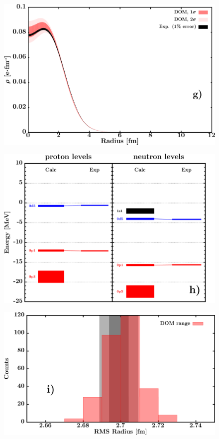 \documentclass[twocolumn,secnumarabic,amssymb, nobibnotes, aps, prl,
superscriptaddress, nobalancelastpage, draft]{revtex4}
\begin{document}
\begin{figure}[!htb]
\begin{minipage}{0.4\linewidth}
        \includegraphics[width=\linewidth]{figures/o16_chargeDensity.png}
        \label{DOM_o16_chargeDensity}
    \end{minipage}\hspace{6pt}
    \begin{minipage}{0.4\linewidth}
        \centering
        \includegraphics[width=\linewidth]{figures/o16_SPLevels.png}
        \label{DOM_o16_SPLevels}
    \end{minipage}
    \begin{minipage}{0.4\linewidth}
        \centering
        \includegraphics[width=\linewidth]{figures/o16_RMSRadius.png}

\end{minipage}
\end{figure}
\end{document}
